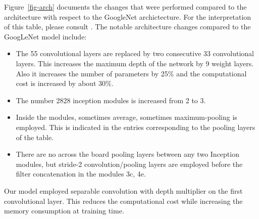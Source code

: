 \documentclass[twocolumn]{article}
\begin{document}
Figure~\ref{fig-arch} documents the changes that were performed compared to the architecture with respect to the GoogleNet archictecture. For the interpretation of this table, please consult \cite{inception}. The notable architecture changes compared to the GoogLeNet model include:
\begin{itemize}
\item The 55 convolutional layers are replaced by two consecutive 33 convolutional layers. This increases the maximum depth of the network by 9 weight layers. Also it increases the number of parameters by 25\% and the computational cost is increased by about 30\%.
\item The number 2828 inception modules is increased from 2 to 3.
\item Inside the modules, sometimes average, sometimes maximum-pooling is employed. This is indicated in the entries corresponding to the pooling layers of the table.
\item There are no across the board pooling layers between any two Inception modules, but stride-2 convolution/pooling layers are employed before the filter concatenation in the modules 3c, 4e.
\end{itemize}
Our model employed separable convolution with depth multiplier  on the first convolutional layer. This reduces the computational cost while increasing the memory consumption at training time.
\end{document}
